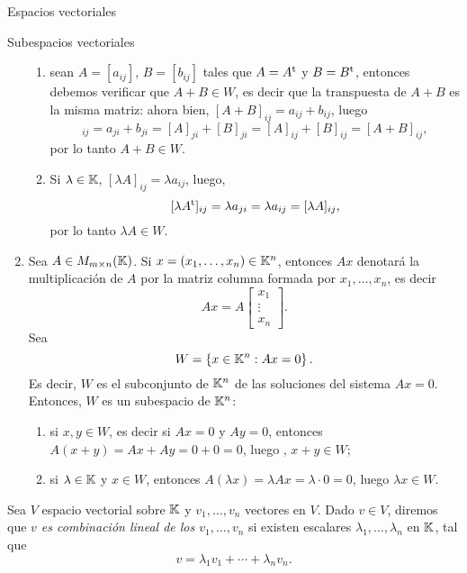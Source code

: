 \begin{chapter}{Espacios vectoriales}
\begin{section}{Subespacios vectoriales}
\begin{ejemplo*}
\begin{enumerate}
\begin{enumerate}
            \item sean $A=[a_{ij}]$, $B= [b_{ij}]$ tales que $A=A^{\operatorname{t}}$ y $B=B^{\operatorname{t}}$, entonces debemos verificar que $A+ B \in W$,  es decir que la transpuesta de $A+B$  es la misma matriz: ahora bien, $[A+B]_{ij} = a_{ij}+b_{ij}$, luego 
            \begin{equation*}
                [(A+B)^\t]_{ij} =a_{ji}+b_{ji} = [A]_{ji} + [B]_{ji} = [A]_{ij} + [B]_{ij} = [A+B]_{ij},
            \end{equation*}
            por lo tanto $A+B \in W$.
            \item Si $\lambda \in \mathbb K$, $[\lambda A]_{ij} = \lambda a_{ij}$, luego, 
            $$
            [\lambda A^{\operatorname{t}}]_{ij} = \lambda a_{ji} = \lambda a_{ij} = [\lambda A]_{ij},
            $$
            por lo tanto $\lambda A \in W$.
        \end{enumerate} 	

        \item Sea $A \in M_{m \times n}(\mathbb K)$. Si $x = (x_1,\ldots,x_n) \in \mathbb K^n$,  entonces $Ax$ denotará la multiplicación de $A$ por la matriz columna formada por $x_1,\ldots,x_n$,  es decir
        $$
        Ax = A\begin{bmatrix} x_1 \\ \vdots \\ x_n\end{bmatrix}.
        $$
        Sea 
        $$
        W = \left\{x \in \mathbb K^n: Ax=0 \right\}.
        $$
        Es decir, $W$  es el subconjunto de $\mathbb K^n$ de las soluciones del sistema $Ax=0$. Entonces, $W$  es un subespacio de $\mathbb K^n$:
        \begin{enumerate}
            \item si $x,y \in W$, es decir si $Ax=0$ y $Ay=0$,  entonces $A(x+y) = Ax + Ay = 0 + 0 = 0$, luego , $x+y \in W$;
            \item si $\lambda \in \mathbb K$ y $x \in W$, entonces $A(\lambda x) = \lambda Ax =\lambda\cdot 0 =0$, luego $\lambda x \in W$. 
        \end{enumerate}
    \end{enumerate}
\end{ejemplo*}

\begin{definicion}
    Sea $V$ espacio vectorial sobre $\mathbb K$ y $v_1,\ldots,v_n$ vectores en $V$. Dado $v \in V$, diremos que\textit{ $v$  es combinación lineal de los $v_1,\ldots,v_n$ } si existen escalares $\lambda_1,\ldots,\lambda_n$ en $\mathbb K$,  tal que 
    $$
    v = \lambda_1v_1+\cdots+\lambda_nv_n.
    $$
\end{definicion}


\end{section}
\end{chapter}

